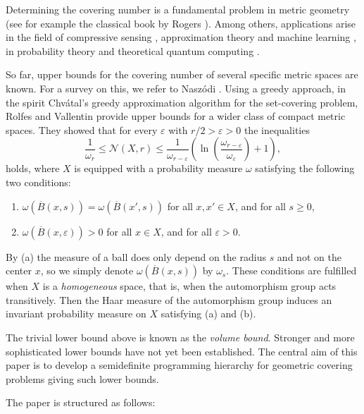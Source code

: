 \documentclass{amsart}
\begin{document}
Determining the covering number is a fundamental problem in metric
geometry (see for example the classical book by Rogers
\cite{Rogers-1964}). Among others, applications arise in the field of
compressive sensing \cite{Foucart-Rauhut-2013}, approximation theory and
machine learning \cite{Cucker-Smale-2002}, in probability theory
\cite{Ledoux-Talagrand-1991} and theoretical quantum computing
\cite{Nielsen-Chuang-2000}.

So far, upper bounds for the covering number of several specific
metric spaces are known. For a survey on this, we refer to Nasz\'odi
\cite{Naszodi-2018}. Using a greedy approach, in the spirit
Chv\'atal's greedy approximation algorithm for the set-covering
problem, Rolfes and Vallentin \cite{Rolfes-Vallentin-2018} provide
upper bounds for a wider class of compact metric spaces.  They showed
that for every $\varepsilon$ with $r/2 > \varepsilon > 0$ the inequalities 
\begin{equation}\label{Eq: ResultGreedypaper}
	\frac{1}{\omega_r} \leq \mathcal{N}(X,r) \leq
	\frac{1}{\omega_{r-\varepsilon}}
	\left(\ln\left(\frac{\omega_{r-\varepsilon}}{\omega_\varepsilon}\right)+1\right),
      \end{equation}
      holds, where $X$ is equipped with a probability measure $\omega$
      satisfying the following two conditions:
\begin{enumerate}
	\item[(a)] $\omega(\overline{B}(x,s))=\omega(\overline{B}(x',s))$ for all $x,x'\in X$, and for
	all $s \geq 0$,
	\item[(b)] $\omega(\overline{B}(x,\varepsilon))>0$ for all $x\in X$, and for all $\varepsilon>0$.
\end{enumerate}
By (a) the measure of a ball does only depend on the radius $s$ and
not on the center $x$, so we simply denote $\omega(\overline{B}(x,s))$
by $\omega_s$. These conditions are fulfilled when $X$ is a
\emph{homogeneous} space, that is, when the automorphism group acts
transitively. Then the Haar measure of the automorphism group induces
an invariant probability measure on $X$ satisfying (a) and (b).

The trivial lower bound above is known as the \emph{volume
  bound}. Stronger and more sophisticated lower bounds have not yet
been established.  The central aim of this paper is to develop a
semidefinite programming hierarchy for geometric covering problems
giving such lower bounds.

\medskip

The paper is structured as follows: 
\end{document}
